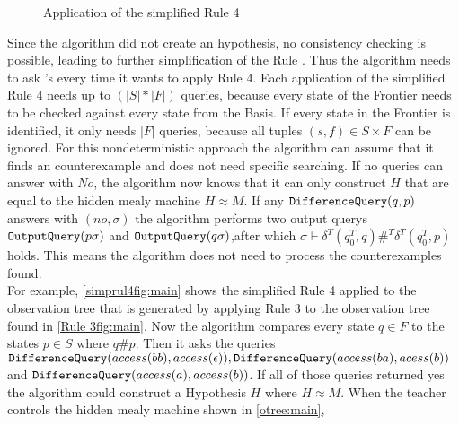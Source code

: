 \begin{figure}
\begin{subfigure}[b]{0.3\textwidth}
	\end{subfigure}
	\caption{Application of the simplified Rule 4}
	\label{simprul4fig:main}
\end{figure}
Since the algorithm did not create an hypothesis, no consistency checking is possible, leading to further simplification of the Rule . Thus the algorithm needs to ask \diffquery's every time it wants to apply Rule 4. Each application of the simplified Rule 4 needs up to $(|S|*|F|)$ queries, because every state of the Frontier needs to be checked against every state from the Basis. If every state in the Frontier is identified, it only needs $|F|$ queries, because all tuples $(s,f)\in S\times F$ can be ignored. For this nondeterministic approach the algorithm can assume that it finds an counterexample and does not need specific searching. If no queries can answer with $No$, the algorithm now knows that it can only construct $H$ that are equal to the hidden mealy machine $H\approx M$. If any $\textnormal{\texttt{DifferenceQuery}}(q,p)$ answers with $(no,\sigma)$ the algorithm performs two output querys $\textnormal{\texttt{OutputQuery}}(p\sigma)$ and $\textnormal{\texttt{OutputQuery}}(q\sigma)$,after which $\sigma\vdash\delta^T(q_0^T,q)\#^T\delta^T(q_0^T,p)$ holds. This means the algorithm does not need to process the counterexamples found.\\
For example, \autoref{simprul4fig:main} shows the simplified Rule 4 applied to the observation tree that is generated by applying Rule 3 to the observation tree found in \autoref{Rule 3fig:main}. Now the algorithm compares every state $q\in F$ to the states $p\in S$ where $ q\#p$. Then it asks the queries $\textnormal{\texttt{DifferenceQuery}}(access(bb),access(\epsilon)), \textnormal{\texttt{DifferenceQuery}}(access(ba),acess(b))$ and 
\newline $\textnormal{\texttt{DifferenceQuery}}(access(a),access(b))$. If all of those queries returned yes the algorithm could construct a Hypothesis $H$ where $H\approx M$. When the teacher controls the hidden mealy machine shown in \autoref{otree:main},
